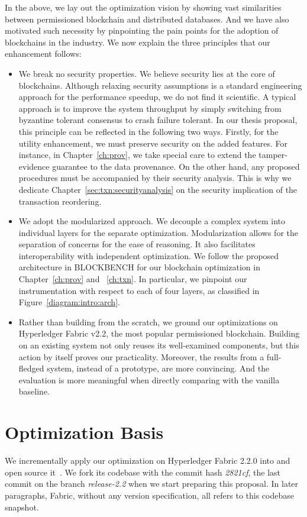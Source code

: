 In the above, we lay out the optimization vision by showing vast similarities between permissioned blockchain and distributed databases. 
And we have also motivated such necessity by pinpointing the pain points for the adoption of blockchains in the industry. 
We now explain the three principles that our enhancement follows:

\begin{itemize}
  \item We break no security properties. We believe security lies at the core of blockchains. Although relaxing security assumptions is a standard engineering approach for the performance speedup, we do not find it scientific. A typical approach is to improve the system throughput by simply switching from byzantine tolerant consensus to crash failure tolerant. In our thesis proposal, this principle can be reflected in the following two ways. Firstly, for the utility enhancement, we must preserve security on the added features. For instance, in Chapter~\ref{ch:prov}, we take special care to extend the tamper-evidence guarantee to the data provenance. On the other hand, any proposed procedures must be accompanied by their security analysis. This is why we dedicate Chapter~\ref{sec:txn:securityanalysis} on the security implication of the transaction reordering. 
  \item We adopt the modularized approach. We decouple a complex system into individual layers for the separate optimization. Modularization allows for the separation of concerns for the ease of reasoning. It also facilitates interoperability with independent optimization. 
  We follow the proposed architecture in BLOCKBENCH for our blockchain optimization in Chapter~\ref{ch:prov} and ~\ref{ch:txn}. In particular, we pinpoint our instrumentation with respect to each of four layers, as classified in Figure~\ref{diagram:intro:arch}. 
  \item Rather than building from the scratch, we ground our optimizations on Hyperledger Fabric v2.2, the most popular permissioned blockchain. Building on an existing system not only reuses its well-examined components, but this action by itself proves our practicality. Moreover, the results from a full-fledged system, instead of a prototype, are more convincing. And the evaluation is more meaningful when directly comparing with the vanilla baseline. 
\end{itemize}

\section{Optimization Basis}
\label{sec:intro:basis}
We incrementally apply our optimization on Hyperledger Fabric 2.2.0 into {\fs} and open source it~\cite{fsharp}. We fork its codebase with the commit hash \textit{2821cf}, the last commit on the branch \textit{release-2.2} when we start preparing this proposal. In later paragraphs, Fabric, without any version specification, all refers to this codebase snapshot. 

